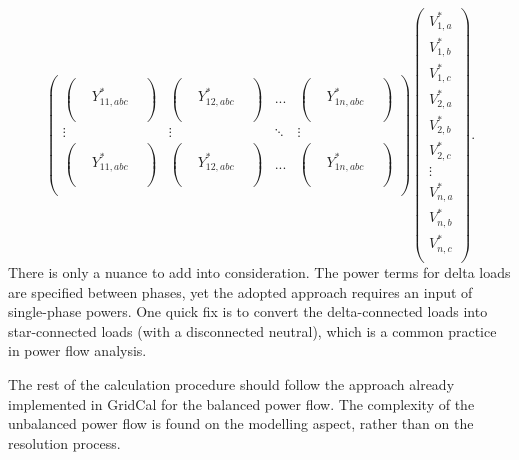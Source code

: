 \documentclass[11pt]{article}
\begin{document}
\begin{equation}
\begin{pmatrix}
			\begin{pmatrix}
				 &  &  \\
				 & Y_{11,abc}^* &  \\
				 &  &  \\
			\end{pmatrix} &
			\begin{pmatrix}
				 &  &  \\
				 & Y_{12,abc}^* &  \\
				 &  &  \\
			\end{pmatrix} &
			...	 &
			\begin{pmatrix}
				 &  &  \\
				 & Y_{1n,abc}^* &  \\
				 &  &  \\
			\end{pmatrix} \\
			\vdots & \vdots & \ddots & \vdots \\
			\begin{pmatrix}
				 &  &  \\
				 & Y_{11,abc}^* &  \\
				 &  &  \\
			\end{pmatrix} &
			\begin{pmatrix}
				 &  &  \\
				 & Y_{12,abc}^* &  \\
				 &  &  \\
			\end{pmatrix} &
			...	&
			\begin{pmatrix}
				 &  &  \\
				 & Y_{1n,abc}^* &  \\
				 &  &  \\
			\end{pmatrix} \\
		\end{pmatrix}
		\begin{pmatrix}
			V_{1,a}^* \\
			V_{1,b}^* \\
			V_{1,c}^* \\
			V_{2,a}^* \\
			V_{2,b}^* \\
			V_{2,c}^* \\
			\vdots \\
			V_{n,a}^* \\
			V_{n,b}^* \\
			V_{n,c}^* \\
		\end{pmatrix}.
	\end{equation}
	There is only a nuance to add into consideration. The power terms for delta loads are specified between phases, yet the adopted approach requires an input of single-phase powers. One quick fix is to convert the delta-connected loads into star-connected loads (with a disconnected neutral), which is a common practice in power flow analysis.

	The rest of the calculation procedure should follow the approach already implemented in GridCal for the balanced power flow. The complexity of the unbalanced power flow is found on the modelling aspect, rather than on the resolution process.


	
	\printbibliography
	
\end{document}
